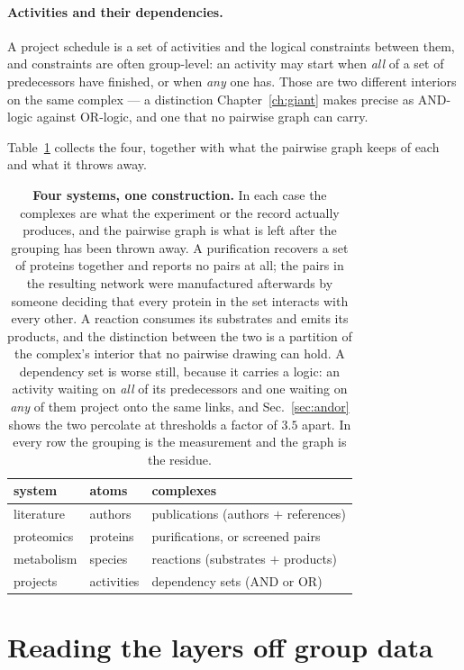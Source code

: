\paragraph{Activities and their dependencies.} A project schedule is a set of
activities and the logical constraints between them, and constraints are often
group-level: an activity may start when \emph{all} of a set of predecessors have
finished, or when \emph{any} one has. Those are two different interiors on the
same complex --- a distinction Chapter~\ref{ch:giant} makes precise as AND-logic
against OR-logic, and one that no pairwise graph can carry.

Table~\ref{tab:systems} collects the four, together with what the pairwise
graph keeps of each and what it throws away.

\begin{table}[t]
\centering\small
\begin{tabular}{lll}
\hline\hline
system & atoms & complexes\\
\hline
literature & authors & publications (authors $+$ references)\\
proteomics & proteins & purifications, or screened pairs\\
metabolism & species & reactions (substrates $+$ products)\\
projects & activities & dependency sets (AND or OR)\\
\hline\hline
\end{tabular}
\caption{\textbf{Four systems, one construction.} In each case the complexes are
what the experiment or the record actually produces, and the pairwise graph is
what is left after the grouping has been thrown away. A purification recovers a
set of proteins together and reports no pairs at all; the pairs in the resulting
network were manufactured afterwards by someone deciding that every protein in
the set interacts with every other. A reaction consumes its substrates and emits
its products, and the distinction between the two is a partition of the
complex's interior that no pairwise drawing can hold. A dependency set is worse
still, because it carries a logic: an activity waiting on \emph{all} of its
predecessors and one waiting on \emph{any} of them project onto the same links,
and Sec.~\ref{sec:andor} shows the two percolate at thresholds a factor of
$3.5$ apart. In every row the grouping is the measurement and the graph is the
residue.}
\label{tab:systems}
\end{table}

\section{Reading the layers off group data}
\label{sec:layers-data}

